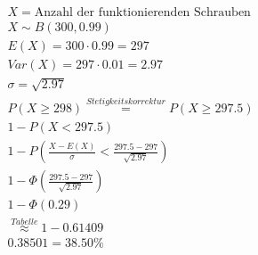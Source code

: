 \begin{align*}
    X = \text{Anzahl der funktionierenden Schrauben}                 \\
    X \sim B(300, 0.99)                                              \\
    E(X) = 300 \cdot 0.99 = 297                                      \\
    Var(X) = 297 \cdot 0.01 = 2.97                                   \\
    \sigma = \sqrt{2.97}                                             \\
    P(X \geq 298) \overset{Stetigkeitskorrektur}{=} P(X \geq 297.5)  \\
    1 - P(X < 297.5)                                                 \\
    1 - P(\frac{X - E(X)}{\sigma} < \frac{297.5 - 297}{\sqrt{2.97}}) \\
    1 - \Phi(\frac{297.5 - 297}{\sqrt{2.97}})                        \\
    1 - \Phi(0.29)                                                   \\
    \overset{Tabelle}{\approx} 1 - 0.61409                           \\
    0.38501 = 38.50\%
\end{align*}